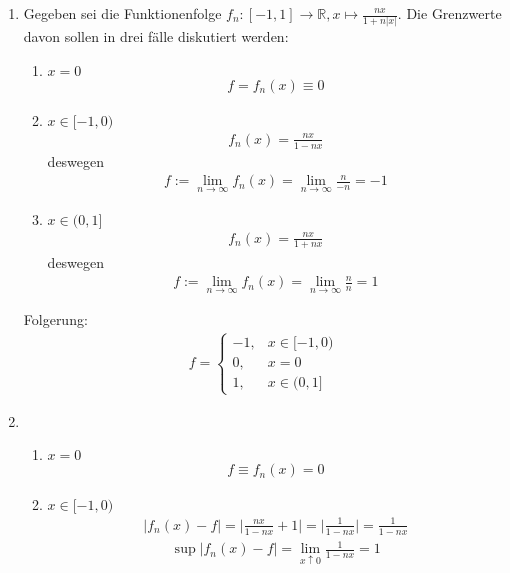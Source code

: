 \documentclass[11pt,a4paper]{article}
\begin{document}
\begin{enumerate}

\item[(a)]

Gegeben sei die Funktionenfolge $f_n:[-1,1]\rightarrow\mathbb{R},x\mapsto\frac{nx}{1+n|x|}$. Die Grenzwerte davon sollen in drei fälle diskutiert werden:
\begin{enumerate}

\item[1.]
$x=0$
\begin{align*}
f=f_n(x)\equiv 0
\end{align*}

\item[2.]
$x\in[-1,0)$
\begin{align*}
f_n(x)=\frac{nx}{1-nx}
\end{align*}
deswegen
\begin{align*}
f:=\lim_{n\rightarrow\infty}f_n(x)=\lim_{n\rightarrow\infty}\frac{n}{-n}=-1
\end{align*}

\item[3.]
$x\in(0,1]$
\begin{align*}
f_n(x)=\frac{nx}{1+nx}
\end{align*}
deswegen
\begin{align*}
f:=\lim_{n\rightarrow\infty}f_n(x)=\lim_{n\rightarrow\infty}\frac{n}{n}=1
\end{align*}

\end{enumerate}

Folgerung:
\begin{align*}
f=
\left\{
\begin{array}{lcl}
-1, & x\in[-1,0) \\
0, & x=0 \\
1, & x\in(0,1]
\end{array}\right.
\end{align*}

\item[(b)]

\begin{enumerate}

\item[1.]
$x=0$
\begin{align*}
f\equiv f_n(x)=0
\end{align*}

\item[2.]
$x\in[-1,0)$
\begin{align*}
|f_n(x)-f|=\bigg|\frac{nx}{1-nx}+1\bigg|=\bigg|\frac{1}{1-nx}\bigg|=\frac{1}{1-nx}
\end{align*}
\begin{align*}
\sup|f_n(x)-f|=\lim_{x\uparrow 0}\frac{1}{1-nx}=1
\end{align*}


\end{enumerate}
\end{enumerate}
\end{document}
